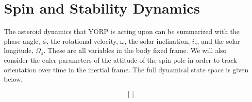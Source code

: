 \documentclass[12pt,notitlepage]{article}
\begin{document}




\section{Spin and Stability Dynamics} \label{spin}

The asteroid dynamics that YORP is acting upon can be summarized with the phase angle, $\phi$, the rotational velocity, $\omega$, the solar inclination, $i_s$, and the solar longitude, $\Omega_s$. These are all variables in the body fixed frame. We will also consider the euler parameters of the attitude of the spin pole in order to track orientation over time in the inertial frame. The full dynamical state space is given below.%

\begin{equation}
    [] = []
\end{equation}
\end{document}
